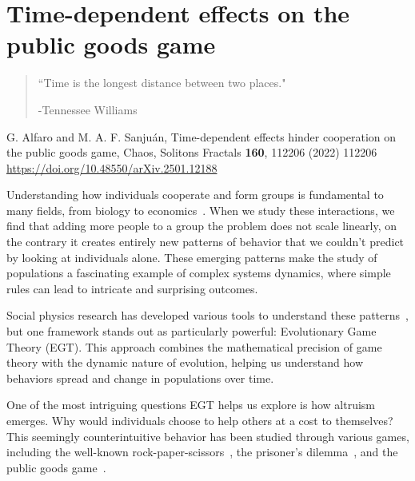 \chapter{Time-dependent effects on the public goods game} %
\label{chap:TimeEffects}



\begin{quotation}

	\vspace{-3cm}

    \begin{flushright}
    \begin{minipage}[t][5cm][b]{0.5\textwidth}
    { ``Time is the longest distance between two places."}
    
    \bigskip
    
    -{\small  Tennessee Williams}
    \end{minipage}
    \end{flushright}
    
    \vspace{0.5cm}
\end{quotation}



G. Alfaro and M. A. F. Sanjuán,
Time-dependent effects hinder cooperation on the public goods game,
Chaos, Solitons Fractals \textbf{160}, 112206 (2022) 112206
\url{https://doi.org/10.48550/arXiv.2501.12188}



Understanding how individuals cooperate and form groups is fundamental to many fields, from biology to economics~\cite{CoopBio,CoopEconomy}. When we study these interactions, we find that adding more people to a group the problem does not scale linearly, on the contrary it creates entirely new patterns of behavior that we couldn't predict by looking at individuals alone. These emerging patterns make the study of populations a fascinating example of complex systems dynamics, where simple rules can lead to intricate and surprising outcomes.

Social physics research has developed various tools to understand these patterns~\cite{SocialPhy}, but one framework stands out as particularly powerful: Evolutionary Game Theory (EGT). This approach combines the mathematical precision of game theory with the dynamic nature of evolution, helping us understand how behaviors spread and change in populations over time.

One of the most intriguing questions EGT helps us explore is how altruism emerges. Why would individuals choose to help others at a cost to themselves? This seemingly counterintuitive behavior has been studied through various games, including the well-known rock-paper-scissors~\cite{RPSCooperation}, the prisoner's dilemma~\cite{Prisionero}, and the public goods game~\cite{PublicGoods}.

